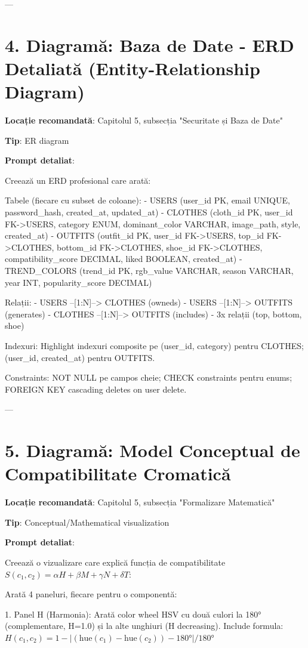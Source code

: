 ---

\section{4. Diagramă: Baza de Date - ERD Detaliată (Entity-Relationship Diagram)}

\textbf{Locație recomandată}: Capitolul 5, subsecția "Securitate și Baza de Date"

\textbf{Tip}: ER diagram

\textbf{Prompt detaliat}:

Creează un ERD profesional care arată:

Tabele (fiecare cu subset de coloane):
- USERS (user_id PK, email UNIQUE, password_hash, created_at, updated_at)
- CLOTHES (cloth_id PK, user_id FK->USERS, category ENUM, dominant_color VARCHAR, image_path, style, created_at)
- OUTFITS (outfit_id PK, user_id FK->USERS, top_id FK->CLOTHES, bottom_id FK->CLOTHES, shoe_id FK->CLOTHES, compatibility_score DECIMAL, liked BOOLEAN, created_at)
- TREND_COLORS (trend_id PK, rgb_value VARCHAR, season VARCHAR, year INT, popularity_score DECIMAL)

Relații:
- USERS --[1:N]--> CLOTHES (owneds)
- USERS --[1:N]--> OUTFITS (generates)
- CLOTHES --[1:N]--> OUTFITS (includes) - 3x relații (top, bottom, shoe)

Indexuri: Highlight indexuri composite pe (user_id, category) pentru CLOTHES; (user_id, created_at) pentru OUTFITS.

Constraints: NOT NULL pe campos cheie; CHECK constraints pentru enums; FOREIGN KEY cascading deletes on user delete.

---

\section{5. Diagramă: Model Conceptual de Compatibilitate Cromatică}

\textbf{Locație recomandată}: Capitolul 5, subsecția "Formalizare Matematică"

\textbf{Tip}: Conceptual/Mathematical visualization

\textbf{Prompt detaliat}:

Creează o vizualizare care explică funcția de compatibilitate $S(c_1, c_2) = \alpha H + \beta M + \gamma N + \delta T$:

Arată 4 paneluri, fiecare pentru o componentă:

1. Panel H (Harmonia): Arată color wheel HSV cu două culori la 180° (complementare, H=1.0) și la alte unghiuri (H decreasing). Include formula: $H(c_1, c_2) = 1 - |(\text{hue}(c_1) - \text{hue}(c_2)) - 180°| / 180°$

